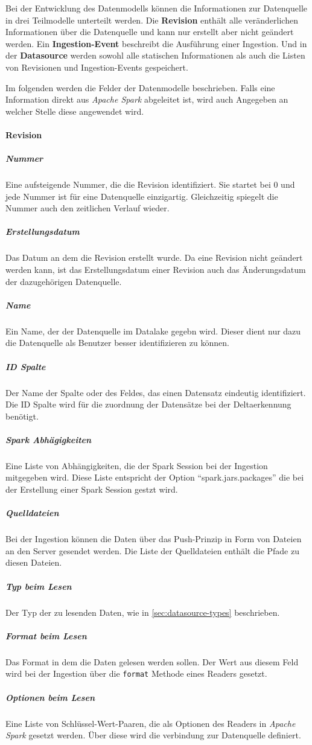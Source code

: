 Bei der Entwicklung des Datenmodells können die Informationen zur Datenquelle in drei Teilmodelle unterteilt werden.
Die \textbf{Revision} enthält alle veränderlichen Informationen über die Datenquelle und kann nur erstellt aber nicht geändert werden.
Ein \textbf{Ingestion-Event} beschreibt die Ausführung einer Ingestion.
Und in der \textbf{Datasource} werden sowohl alle statischen Informationen als auch die Listen von Revisionen und Ingestion-Events gespeichert.

Im folgenden werden die Felder der Datenmodelle beschrieben.
Falls eine Information direkt aus \textit{Apache Spark} abgeleitet ist, wird auch Angegeben an welcher Stelle diese angewendet wird.

\paragraph{Revision}
\subparagraph{Nummer}
Eine aufsteigende Nummer, die die Revision identifiziert.
Sie startet bei 0 und jede Nummer ist für eine Datenquelle einzigartig.
Gleichzeitig spiegelt die Nummer auch den zeitlichen Verlauf wieder.
\subparagraph{Erstellungsdatum}
Das Datum an dem die Revision erstellt wurde.
Da eine Revision nicht geändert werden kann, ist das Erstellungsdatum einer Revision auch das Änderungsdatum der dazugehörigen Datenquelle.
\subparagraph{Name}
Ein Name, der der Datenquelle im Datalake gegebn wird.
Dieser dient nur dazu die Datenquelle als Benutzer besser identifizieren zu können.
\subparagraph{ID Spalte}
Der Name der Spalte oder des Feldes, das einen Datensatz eindeutig identifiziert.
Die ID Spalte wird für die zuordnung der Datensätze bei der Deltaerkennung benötigt.
\subparagraph{Spark Abhägigkeiten}
Eine Liste von Abhängigkeiten, die der Spark Session bei der Ingestion mitgegeben wird.
Diese Liste entspricht der Option "`spark.jars.packages"' die bei der Erstellung einer Spark Session gestzt wird.
\subparagraph{Quelldateien}
Bei der Ingestion können die Daten über das Push-Prinzip in Form von Dateien an den Server gesendet werden.
Die Liste der Quelldateien enthält die Pfade zu diesen Dateien.
\subparagraph{Typ beim Lesen}
Der Typ der zu lesenden Daten, wie in \ref{sec:datasource-types} beschrieben.
\subparagraph{Format beim Lesen}
Das Format in dem die Daten gelesen werden sollen.
Der Wert aus diesem Feld wird bei der Ingestion über die \verb|format| Methode eines Readers gesetzt.
\subparagraph{Optionen beim Lesen}
Eine Liste von Schlüssel-Wert-Paaren, die als Optionen des Readers in \textit{Apache Spark} gesetzt werden.
Über diese wird die verbindung zur Datenquelle definiert.
